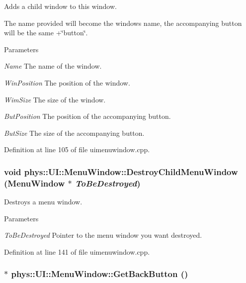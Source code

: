 Adds a child window to this window. 

The name provided will become the windows name, the accompanying button will be the same +\char`\"{}button\char`\"{}. 
\begin{DoxyParams}{Parameters}
\item[{\em Name}]The name of the window. \item[{\em WinPosition}]The position of the window. \item[{\em WimSize}]The size of the window. \item[{\em ButPosition}]The position of the accompanying button. \item[{\em ButSize}]The size of the accompanying button. \end{DoxyParams}


Definition at line 105 of file uimenuwindow.cpp.

\hypertarget{classphys_1_1UI_1_1MenuWindow_ace2796c2d250fe1582f7c43333a7295e}{
\subsubsection[{DestroyChildMenuWindow}]{\setlength{\rightskip}{0pt plus 5cm}void phys::UI::MenuWindow::DestroyChildMenuWindow ({\bf MenuWindow} $\ast$ {\em ToBeDestroyed})}}
\label{d4/d07/classphys_1_1UI_1_1MenuWindow_ace2796c2d250fe1582f7c43333a7295e}


Destroys a menu window. 


\begin{DoxyParams}{Parameters}
\item[{\em ToBeDestroyed}]Pointer to the menu window you want destroyed. \end{DoxyParams}


Definition at line 141 of file uimenuwindow.cpp.

\hypertarget{classphys_1_1UI_1_1MenuWindow_a7c286758bac0e21154f41a56d9da8c08}{
\subsubsection[{GetBackButton}]{ $\ast$ phys::UI::MenuWindow::GetBackButton ()}}
\label{d4/d07/classphys_1_1UI_1_1MenuWindow_a7c286758bac0e21154f41a56d9da8c08}


